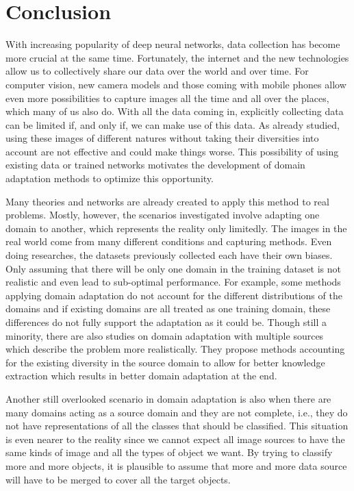 \chapter{Conclusion} \label{ch:conclusion}
With increasing popularity of deep neural networks, data collection has become more crucial at the same time. Fortunately, the internet and the new technologies allow us to collectively share our data over the world and over time. For computer vision, new camera models and those coming with mobile phones allow even more possibilities to capture images all the time and all over the places, which many of us also do. With all the data coming in, explicitly collecting data can be limited if, and only if, we can make use of this data. As already studied, using these images of different natures without taking their diversities into account are not effective and could make things worse. This possibility of using existing data or trained networks motivates the development of domain adaptation methods to optimize this opportunity. 

Many theories and networks are already created to apply this method to real problems. Mostly, however, the scenarios investigated involve adapting one domain to another, which represents the reality only limitedly. The images in the real world come from many different conditions and capturing methods. Even doing researches, the datasets previously collected each have their own biases. Only assuming that there will be only one domain in the training dataset is not realistic and even lead to sub-optimal performance. For example, some methods applying domain adaptation do not account for the different distributions of the domains and if existing domains are all treated as one training domain, these differences do not fully support the adaptation as it could be. Though still a minority, there are also studies on domain adaptation with multiple sources which describe the problem more realistically. They propose methods accounting for the existing diversity in the source domain to allow for better knowledge extraction which results in better domain adaptation at the end. 

Another still overlooked scenario in domain adaptation is also when there are many domains acting as a source domain and they are not complete, i.e., they do not have representations of all the classes that should be classified. This situation is even nearer to the reality since we cannot expect all image sources to have the same kinds of image and all the types of object we want. By trying to classify more and more objects, it is plausible to assume that more and more data source will have to be merged to cover all the target objects. 

